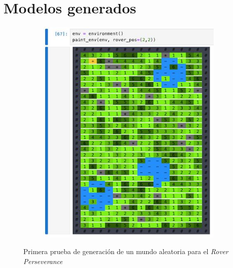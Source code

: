 \documentclass[12pt, letterpaper]{article}
\begin{document}
\section{Modelos generados}

    \begin{figure}[h!]
        \centering
        \begin{subfigure}[h!]{0.45\textwidth}
            \centering
            \includegraphics[scale=0.25,angle=0]{env.jpeg}
        \end{subfigure}
        \hfill
        \centering
        \caption{Primera prueba de generación de un mundo aleatoria para el \textit{Rover Perseverance}}
        \label{env}
    \end{figure}
\end{document}
